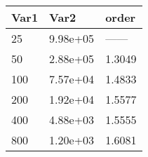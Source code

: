 \begin{tabular}{lll}
Var1 & Var2 & order \\ 
\hline 
25 & 9.98e+05 & ------ \\ 
50 & 2.88e+05 & 1.3049 \\ 
100 & 7.57e+04 & 1.4833 \\ 
200 & 1.92e+04 & 1.5577 \\ 
400 & 4.88e+03 & 1.5555 \\ 
800 & 1.20e+03 & 1.6081 \\ 
\hline 
\end{tabular}